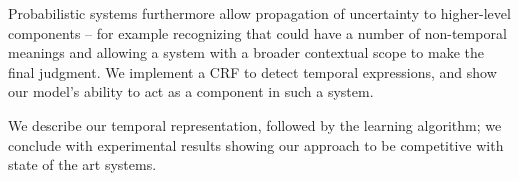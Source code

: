 Probabilistic systems furthermore allow propagation of uncertainty
	to higher-level components -- for example recognizing that  could
	have a number of non-temporal meanings and allowing a system with a broader
	contextual scope to make the final judgment.
We implement a CRF to detect temporal expressions, and show our model's ability to act as a 
	component in such a system.

We describe our temporal representation,
	followed by the learning algorithm; 
	we conclude with experimental results showing our
	approach to be competitive with state of the art systems.


